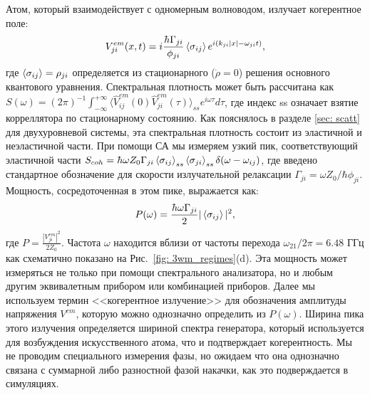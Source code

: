 Атом, который взаимодействует с одномерным волноводом, излучает когерентное поле:
\begin{equation}
	V^{em}_{ji}(x,t)=i\frac{\hbar\Gamma_{ji}}{\phi_{ji}}\braket{\sigma_{ij}}e^{i (k_{ji}|x|-\omega_{ji}t)},
	\label{eq:V}
\end{equation}
где $\braket{\sigma_{ij}}=\rho_{ji}$ определяется из стационарного ($\dot{\rho}=0$) решения основного квантового уравнения. Спектральная плотность может быть рассчитана как $S(\omega) = (2\pi)^{-1}\int_{-\infty}^{+\infty}\langle\hat{V}^{em}_{ij}(0)\hat{V}_{ji}^{em}(\tau)\rangle_{ss}e^{i\omega \tau} d\tau$, где индекс ss означает взятие корреллятора по стационарному состоянию. Как пояснялось в разделе \ref{sec: scatt} для двухуровневой системы, эта спектральная плотность состоит из эластичной и неэластичной части. При помощи СА мы измеряем узкий пик, соответствующий эластичной части $S_{coh}=\hbar \omega Z_{0} \Gamma_{ji} \braket{\sigma_{ij}}_{ss} \braket{\sigma_{ji}}_{ss} \delta(\omega-\omega_{ij})$, где введено стандартное обозначение для скорости излучательной релаксации $\Gamma_{ji} = \omega Z_{0}/\hbar \phi_{ji}$. Мощность, сосредоточенная в этом пике, выражается как:
\begin{equation}
	P(\omega)=\frac{\hbar\omega\Gamma_{ji}}{2} |\braket{\sigma_{ij}}|^2,
\end{equation}
где $P=\frac{|V_{ji}^{em}|^2}{2Z_0}$. Частота $\omega$ находится вблизи от частоты перехода $\omega_{21}/ 2\pi=6.48$ ГГц как схематично показано на Рис.~\ref{fig: 3wm_regimes}(d). Эта мощность может измеряться не только при помощи спектрального анализатора, но и любым другим эквивалетным прибором или комбинацией приборов. Далее мы используем термин <<когерентное излучение>> для обозначения амплитуды напряжения $V^{em}$, которую можно однозначно определить из $P(\omega)$. Ширина пика этого излучения определяется шириной спектра генератора, который используется для возбуждения искусственного атома, что и подтверждает когерентность. Мы не проводим специального измерения фазы, но ожидаем что она однозначно связана с суммарной либо разностной фазой накачки, как это подверждается в симуляциях. %

